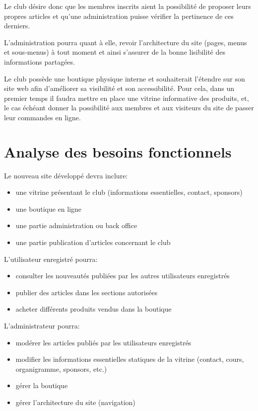 \documentclass[a4paper,11pt]{report}
\begin{document}
Le club désire donc que les membres inscrits aient la possibilité de proposer leurs propres articles et qu’une administration puisse vérifier la pertinence de ces derniers.

L’administration pourra quant à elle, revoir l’architecture du site (pages, menus et sous-menus) à tout moment et ainsi s’assurer de la bonne lisibilité des informations partagées. 

Le club possède une boutique physique interne et souhaiterait l’étendre sur son site web afin d’améliorer sa visibilité et son accessibilité. Pour cela, dans un premier temps il faudra mettre en place une vitrine informative des produits, et, le cas échéant donner la possibilité aux membres et aux visiteurs du site de passer leur commandes en ligne.

\chapter{Analyse des besoins fonctionnels}
Le nouveau site développé devra inclure:
\begin{itemize}
\item{une vitrine présentant le club (informations essentielles, contact, sponsors)}
\item{une boutique en ligne}
\item{une partie administration ou back office}
\item{une partie publication d’articles concernant le club}
\end{itemize}

L’utilisateur enregistré pourra:

\begin{itemize}
\item{consulter les nouveautés publiées par les autres utilisateurs enregistrés}
\item{publier des articles dans les sections autorisées}
\item{acheter différents produits vendus dans la boutique}
\end{itemize}

L’administrateur pourra:
\begin{itemize}
\item{modérer les articles publiés par les utilisateurs enregistrés}
\item{modifier les informations essentielles statiques de la vitrine (contact, cours, organigramme, sponsors, etc.)}
\item{gérer la boutique}
\item{gérer l’architecture du site (navigation)}
\end{itemize}
\end{document}
